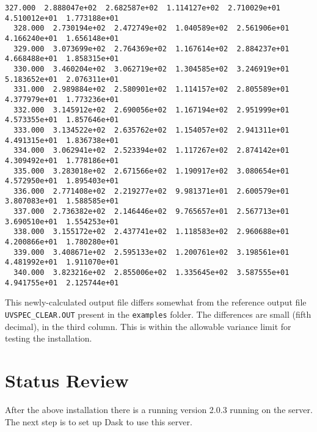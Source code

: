 \begin{lstlisting}[style=tinysize]
  327.000  2.888047e+02  2.682587e+02  1.114127e+02  2.710029e+01  4.510012e+01  1.773188e+01 
  328.000  2.730194e+02  2.472749e+02  1.040589e+02  2.561906e+01  4.166240e+01  1.656148e+01 
  329.000  3.073699e+02  2.764369e+02  1.167614e+02  2.884237e+01  4.668488e+01  1.858315e+01 
  330.000  3.460204e+02  3.062719e+02  1.304585e+02  3.246919e+01  5.183652e+01  2.076311e+01 
  331.000  2.989884e+02  2.580901e+02  1.114157e+02  2.805589e+01  4.377979e+01  1.773236e+01 
  332.000  3.145912e+02  2.690056e+02  1.167194e+02  2.951999e+01  4.573355e+01  1.857646e+01 
  333.000  3.134522e+02  2.635762e+02  1.154057e+02  2.941311e+01  4.491315e+01  1.836738e+01 
  334.000  3.062941e+02  2.523394e+02  1.117267e+02  2.874142e+01  4.309492e+01  1.778186e+01 
  335.000  3.283018e+02  2.671566e+02  1.190917e+02  3.080654e+01  4.572950e+01  1.895403e+01 
  336.000  2.771408e+02  2.219277e+02  9.981371e+01  2.600579e+01  3.807083e+01  1.588585e+01 
  337.000  2.736382e+02  2.146446e+02  9.765657e+01  2.567713e+01  3.690510e+01  1.554253e+01 
  338.000  3.155172e+02  2.437741e+02  1.118583e+02  2.960688e+01  4.200866e+01  1.780280e+01 
  339.000  3.408671e+02  2.595133e+02  1.200761e+02  3.198561e+01  4.481992e+01  1.911070e+01 
  340.000  3.823216e+02  2.855006e+02  1.335645e+02  3.587555e+01  4.941755e+01  2.125744e+01 
\end{lstlisting}

This newly-calculated output file differs somewhat from the reference output file \lstinline{UVSPEC_CLEAR.OUT} present in the \lstinline{examples} folder.  The differences are small (fifth decimal), in the third column.  This is within the allowable variance limit for testing the installation.

\section{Status Review}

After the above installation there is a running \libradtran{} version 2.0.3 running on the server. The next step is to set up Dask to use this server.